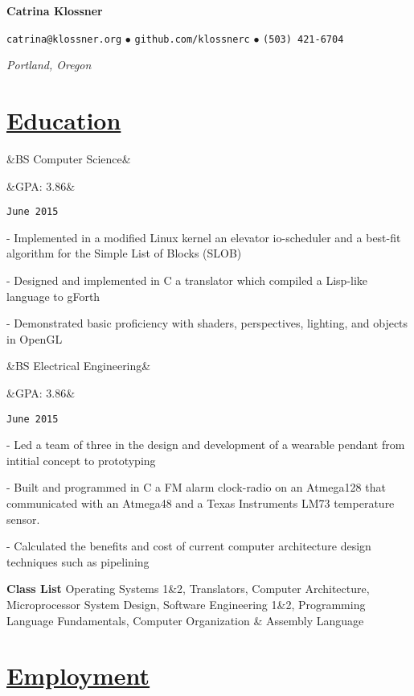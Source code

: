 \documentclass[11pt]{article}
\newcommand{\heading}[1]{
    \section*{\uline{\hfill #1}}
}
\newcommand{\squish}{
    \setlength{\itemsep}{0.5pt}
    \setlength{\parskip}{0pt}
    \setlength{\parsep}{0.5pt}
}
\newcommand{\when}[1]{
    \hfill \texttt{#1}
}
\newcommand{\experience}[4]{
    \ifx&#2&
        \item[{#1}]
    \else
        \ifx&#3&
            \item[{#1}, \emph{#2}]
        \else
            \item[{#1}, \emph{#2}, \small{#3}]
        \fi
    \fi
    \when{#4}
}
\newcommand{\contact}[4]{
    \centerline{
        \large       
        \texttt{#1}
        $\bullet$
        \texttt{#2}
        $\bullet$
        \texttt{#3}
    }
    \centerline{
        \emph{#4}
    }
}
\newcommand{\skill}[2]{
    \textbf{#1} \hfill #2
}
\newcommand{\CPP}{
    C\hspace{-.05em}\raisebox{.4ex}{\tiny\bf +}\hspace{-.10em}\raisebox{.4ex}{\tiny\bf +}
}
\begin{document}
\centerline{{\Huge \bf Catrina Klossner}}
\bigskip

\contact{catrina@klossner.org}
        {github.com/klossnerc}
        {(503) 421-6704}
        {Portland, Oregon}

%
%
%
%

\heading{Education}%

\begin{description}
\squish   
\experience{Oregon State University}
           {BS Computer Science}
           {GPA: 3.86}
           {June 2015}

	- Implemented in a modified Linux kernel an elevator io-scheduler and a best-fit algorithm for the Simple List of Blocks (SLOB) 

	- Designed and implemented in C a translator which compiled a Lisp-like language to gForth 

	- Demonstrated basic proficiency with shaders, perspectives, lighting, and objects in OpenGL 


\experience{Oregon State University}
           {BS Electrical Engineering}
           {GPA: 3.86}
           {June 2015}

	- Led a team of three in the design and development of a wearable pendant from intitial concept to prototyping 

	- Built and programmed in C a FM alarm clock-radio on an Atmega128 that communicated with an Atmega48 and a Texas Instruments LM73 temperature sensor.

	- Calculated the benefits and cost of current computer architecture design techniques such as pipelining 

\end{description}

\skill{Class List}{Operating Systems 1\&2, Translators, Computer Architecture, Microprocessor System Design, Software Engineering 1\&2, Programming Language Fundamentals, Computer Organization \& Assembly Language}


\heading{Employment}%
\end{document}
